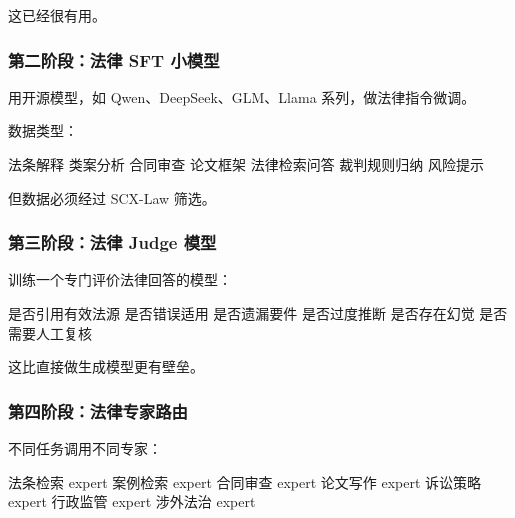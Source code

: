\documentclass[
  12pt,
]{ctexart}
\newenvironment{Shaded}{}{}
\newcommand{\NormalTok}[1]{#1}
\begin{document}
这已经很有用。

\subsubsection{第二阶段：法律 SFT
小模型}\label{ux7b2cux4e8cux9636ux6bb5ux6cd5ux5f8b-sft-ux5c0fux6a21ux578b}

用开源模型，如 Qwen、DeepSeek、GLM、Llama 系列，做法律指令微调。

数据类型：

\begin{Shaded}
\begin{Highlighting}[]
\NormalTok{法条解释}
\NormalTok{类案分析}
\NormalTok{合同审查}
\NormalTok{论文框架}
\NormalTok{法律检索问答}
\NormalTok{裁判规则归纳}
\NormalTok{风险提示}
\end{Highlighting}
\end{Shaded}

但数据必须经过 SCX-Law 筛选。

\subsubsection{第三阶段：法律 Judge
模型}\label{ux7b2cux4e09ux9636ux6bb5ux6cd5ux5f8b-judge-ux6a21ux578b}

训练一个专门评价法律回答的模型：

\begin{Shaded}
\begin{Highlighting}[]
\NormalTok{是否引用有效法源}
\NormalTok{是否错误适用}
\NormalTok{是否遗漏要件}
\NormalTok{是否过度推断}
\NormalTok{是否存在幻觉}
\NormalTok{是否需要人工复核}
\end{Highlighting}
\end{Shaded}

这比直接做生成模型更有壁垒。

\subsubsection{第四阶段：法律专家路由}\label{ux7b2cux56dbux9636ux6bb5ux6cd5ux5f8bux4e13ux5bb6ux8defux7531}

不同任务调用不同专家：

\begin{Shaded}
\begin{Highlighting}[]
\NormalTok{法条检索 expert}
\NormalTok{案例检索 expert}
\NormalTok{合同审查 expert}
\NormalTok{论文写作 expert}
\NormalTok{诉讼策略 expert}
\NormalTok{行政监管 expert}
\NormalTok{涉外法治 expert}
\end{Highlighting}
\end{Shaded}
\end{document}
